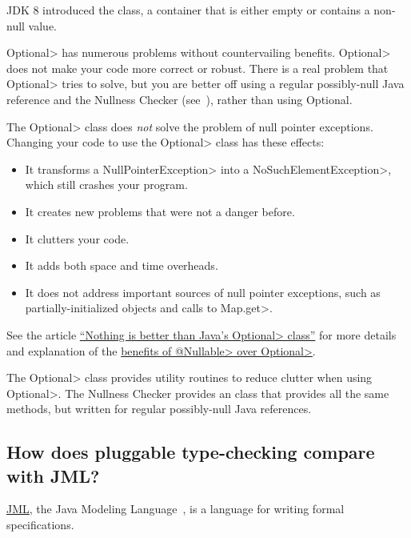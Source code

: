 JDK 8 introduced the 
class, a container that is either empty or contains a non-null value.

\<Optional> has numerous problems without countervailing benefits.
\<Optional> does not make your code more correct or robust. There is a real
problem that \<Optional> tries to solve, but you are better off using a
regular possibly-null Java reference and the Nullness Checker
(see~), rather than using Optional.

The \<Optional> class does \emph{not} solve the problem of null pointer
exceptions.  Changing your code to use the \<Optional> class has these effects:

\begin{itemize}
\item
It transforms a \<NullPointerException> into a \<NoSuchElementException>,
which still crashes your program.
\item
It creates new problems that were not a danger before.
\item
It clutters your code.
\item
It adds both space and time overheads.
\item
It does not address important sources of null pointer exceptions, such as
partially-initialized objects and calls to \<Map.get>.
\end{itemize}

See the article
\href{http://homes.cs.washington.edu/~mernst/advice/nothing-is-better-than-optional.html}{``Nothing
  is better than Java's \<Optional> class''} for more details and
explanation of the
\href{http://homes.cs.washington.edu/~mernst/advice/nothing-is-better-than-optional.html#benefits-of-nullable}{benefits of \<@Nullable> over \<Optional>}.

The \<Optional> class provides utility routines to reduce clutter when
using \<Optional>.  The Nullness Checker provides an
 class that provides all the same methods,
but written for regular possibly-null Java references.


\subsection{How does pluggable type-checking compare with JML?\label{faq-jml}}

\href{http://www.eecs.ucf.edu/~leavens/JML//index.shtml}{JML}, the Java Modeling
Language~\cite{LeavensBR2006:JML}, is a language for writing formal
specifications.

